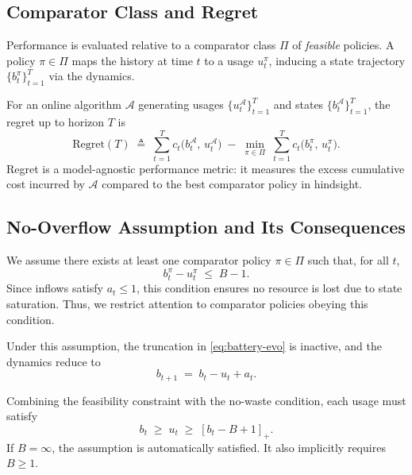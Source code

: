 \documentclass[11pt]{article}
\begin{document}
\subsection{Comparator Class and Regret}
Performance is evaluated relative to a comparator class \(\Pi\) of \textit{feasible} policies.  
A policy \(\pi\in\Pi\) maps the history at time \(t\) to a usage \(u_t^\pi\), inducing a state trajectory \(\{b_t^\pi\}_{t=1}^T\) via the dynamics.  

For an online algorithm \(\mathcal{A}\) generating usages \(\{u_t^{\mathcal{A}}\}_{t=1}^T\) and states \(\{b_t^{\mathcal{A}}\}_{t=1}^T\), the regret up to horizon \(T\) is
\[
\mathrm{Regret}(T)
\;\triangleq\;
\sum_{t=1}^T c_t\!\bigl(b_t^{\mathcal{A}},\,u_t^{\mathcal{A}}\bigr)
\;-\;
\min_{\pi\in\Pi}\;
\sum_{t=1}^T c_t\!\bigl(b_t^\pi,\,u_t^\pi\bigr).
\]
Regret is a model-agnostic performance metric: it measures the excess cumulative cost incurred by \(\mathcal{A}\) compared to the best comparator policy in hindsight.

\subsection{No-Overflow Assumption and Its Consequences}
We assume there exists at least one comparator policy \(\pi \in \Pi\) such that, for all \(t\),
\[
b_t^\pi - u_t^\pi \;\le\; B - 1 .
\]
Since inflows satisfy \(a_t \le 1\), this condition ensures no resource is lost due to state saturation.
Thus, we restrict attention to comparator policies obeying this condition.  

Under this assumption, the truncation in \eqref{eq:battery-evo} is inactive, and the dynamics reduce to
\begin{equation}
\label{eq:evo-no-saturation}
b_{t+1} \;=\; b_t - u_t + a_t .
\end{equation}


Combining the feasibility constraint with the no-waste condition, each usage must satisfy
\begin{equation}
    \label{eq:3-coinstraints}
    b_t \;\ge\; u_t \;\ge\; [b_t - B + 1]_+ .
\end{equation}
If \(B=\infty\), the assumption is automatically satisfied.  
It also implicitly requires \(B \ge 1\).




\end{document}
